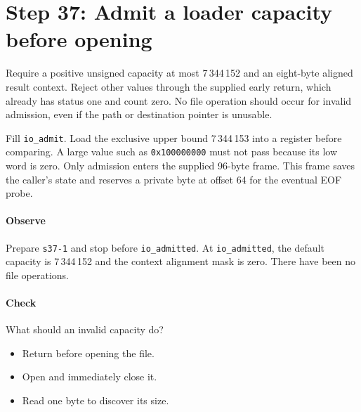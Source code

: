 \section{Step 37: Admit a loader capacity before opening}
Require a positive unsigned capacity at most 7\,344\,152 and an eight-byte
aligned result context. Reject other values through the supplied early return,
which already has status one and count zero. No file operation should occur
for invalid admission, even if the path or destination pointer is unusable.

Fill \texttt{io\_admit}. Load the exclusive upper bound 7\,344\,153 into a
register before comparing. A large value such as \texttt{0x100000000} must not
pass because its low word is zero. Only admission enters the supplied 96-byte
frame. This frame saves the caller's state and reserves a private byte at offset
64 for the eventual EOF probe.

\paragraph{Observe} Prepare \texttt{s37-1} and stop before
\texttt{io\_admitted}. At \texttt{io\_admitted}, the default capacity is 7\,344\,152
and the context alignment mask is zero. There have been no file operations.

\paragraph{Check} What should an invalid capacity do?
\begin{itemize}
\item[A.] Return before opening the file.
\item[B.] Open and immediately close it.
\item[C.] Read one byte to discover its size.
\end{itemize}
